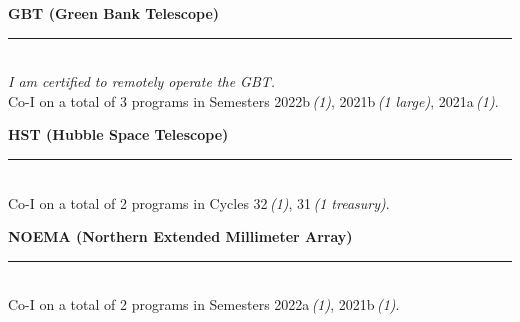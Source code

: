 \documentclass[11pt]{article}
\makeatletter
\def\vhrulefill#1{\leavevmode\leaders\hrule \@height #1\hfill \kern\z@}
\newcommand{\subsectionname}[1]{{\large\bf #1 \vhrulefill{0.5pt}}}
\makeatother
\begin{document}
\subsectionname{GBT \textmd{\small (Green Bank Telescope)}}\\
{\small\em I am certified to remotely operate the GBT.}\\
Co-I on a total of 3 programs in Semesters 2022b\,{\em(1)}, 2021b\,{\em(1 large)}, 2021a\,{\em(1)}.


\subsectionname{HST \textmd{\small (Hubble Space Telescope)}}\\
Co-I on a total of 2 programs in Cycles 32\,{\em(1)}, 31\,{\em(1 treasury)}.


\subsectionname{NOEMA \textmd{\small (Northern Extended Millimeter Array)}}\\
Co-I on a total of 2 programs in Semesters 2022a\,{\em(1)}, 2021b\,{\em(1)}.

\end{document}
